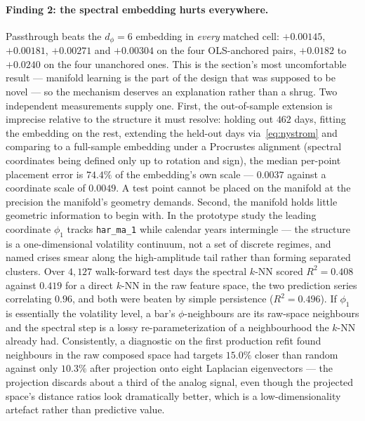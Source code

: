 \paragraph{Finding 2: the spectral embedding hurts everywhere.}
Passthrough beats the $d_\phi = 6$ embedding in \emph{every} matched cell:
$+0.00145$, $+0.00181$, $+0.00271$ and $+0.00304$ on the four OLS-anchored pairs,
$+0.0182$ to $+0.0240$ on the four unanchored ones. This is the section's most
uncomfortable result --- manifold learning is the part of the design that was
supposed to be novel --- so the mechanism deserves an explanation rather than a
shrug. Two independent measurements supply one. First, the out-of-sample extension
is imprecise relative to the structure it must resolve: holding out $462$ days,
fitting the embedding on the rest, extending the held-out days
via~\eqref{eq:nystrom} and comparing to a full-sample embedding under a Procrustes
alignment (spectral coordinates being defined only up to rotation and sign), the
median per-point placement error is $74.4\%$ of the embedding's own scale ---
$0.0037$ against a coordinate scale of $0.0049$. A test point cannot be placed on
the manifold at the precision the manifold's geometry demands. Second, the manifold
holds little geometric information to begin with. In the prototype study the
leading coordinate $\phi_1$ tracks \texttt{har\_ma\_1} while calendar years
intermingle --- the structure is a one-dimensional volatility continuum, not a set
of discrete regimes, and named crises smear along the high-amplitude tail rather
than forming separated clusters. Over $4{,}127$ walk-forward test days the spectral
$k$-NN scored $R^2 = 0.408$ against $0.419$ for a direct $k$-NN in the raw feature
space, the two prediction series correlating $0.96$, and both were beaten by simple
persistence ($R^2 = 0.496$). If $\phi_1$ is essentially the volatility level, a
bar's $\phi$-neighbours are its raw-space neighbours and the spectral step is a
lossy re-parameterization of a neighbourhood the $k$-NN already had. Consistently,
a diagnostic on the first production refit found neighbours in the raw composed
space had targets $15.0\%$ closer than random against only $10.3\%$ after
projection onto eight Laplacian eigenvectors --- the projection discards about a
third of the analog signal, even though the projected space's distance ratios look
dramatically better, which is a low-dimensionality artefact rather than predictive
value.

